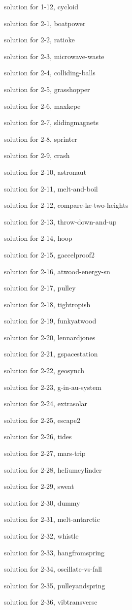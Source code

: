 \documentclass{problems}
\begin{document}
solution for 1-12, cycloid

solution for 2-1, boatpower

solution for 2-2, ratioke

solution for 2-3, microwave-waste

solution for 2-4, colliding-balls

solution for 2-5, grasshopper

solution for 2-6, maxkepe

solution for 2-7, slidingmagnets

solution for 2-8, sprinter

solution for 2-9, crash

solution for 2-10, astronaut

solution for 2-11, melt-and-boil

solution for 2-12, compare-ke-two-heights

solution for 2-13, throw-down-and-up

solution for 2-14, hoop

solution for 2-15, gaccelproof2

solution for 2-16, atwood-energy-sn

solution for 2-17, pulley

solution for 2-18, tightropish

solution for 2-19, funkyatwood

solution for 2-20, lennardjones

solution for 2-21, gspacestation

solution for 2-22, geosynch

solution for 2-23, g-in-au-system

solution for 2-24, extrasolar

solution for 2-25, escape2

solution for 2-26, tides

solution for 2-27, mars-trip

solution for 2-28, heliumcylinder

solution for 2-29, sweat

solution for 2-30, dummy

solution for 2-31, melt-antarctic

solution for 2-32, whistle

solution for 2-33, hangfromspring

solution for 2-34, oscillate-vs-fall

solution for 2-35, pulleyandspring

solution for 2-36, vibtransverse
\end{document}

